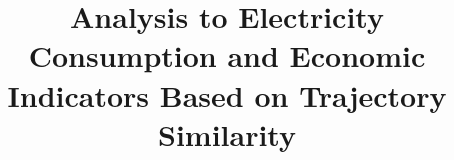 \documentclass{sig-alternate-05-2015}
\begin{document}




\title{Analysis to Electricity Consumption and Economic Indicators Based on Trajectory Similarity}

\author{ \vspace{-1em}
}

\maketitle











\end{document}
